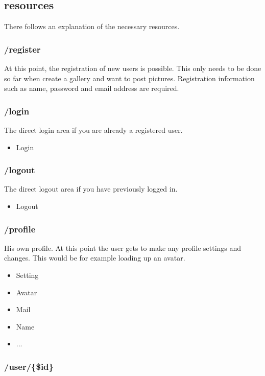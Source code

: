 \documentclass[a4paper,12pt,oneside]{article} %
\begin{document}
\subsection{resources }

There follows an explanation of the necessary resources.


\subsubsection{/register}

At this point, the registration of new users is possible. This only
needs to be done so far when create a gallery and want to post pictures.
Registration information such as name, password and email address
are required.


\subsubsection{/login}

The direct login area if you are already a registered user.
\begin{itemize}
\item Login
\end{itemize}

\subsubsection{/logout}

The direct logout area if you have previously logged in.
\begin{itemize}
\item Logout
\end{itemize}

\subsubsection{/profile}

His own profile. At this point the user gets to make any profile settings
and changes. This would be for example loading up an avatar.
\begin{itemize}
\item Setting
\item Avatar
\item Mail
\item Name
\item ...
\end{itemize}

\subsubsection{/user/\{\$id\}}
\end{document}
